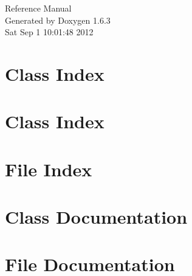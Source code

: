\documentclass[a4paper]{book}
\begin{document}
\hypersetup{pageanchor=false}
\begin{titlepage}
\vspace*{7cm}
\begin{center}
{\Large Reference Manual}\\
\vspace*{1cm}
{\large Generated by Doxygen 1.6.3}\\
\vspace*{0.5cm}
{\small Sat Sep 1 10:01:48 2012}\\
\end{center}
\end{titlepage}
\clearemptydoublepage
{}
\tableofcontents
\clearemptydoublepage
{}
\hypersetup{pageanchor=true}
\chapter{Class Index}

\chapter{Class Index}

\chapter{File Index}

\chapter{Class Documentation}














\chapter{File Documentation}














\printindex
\end{document}
